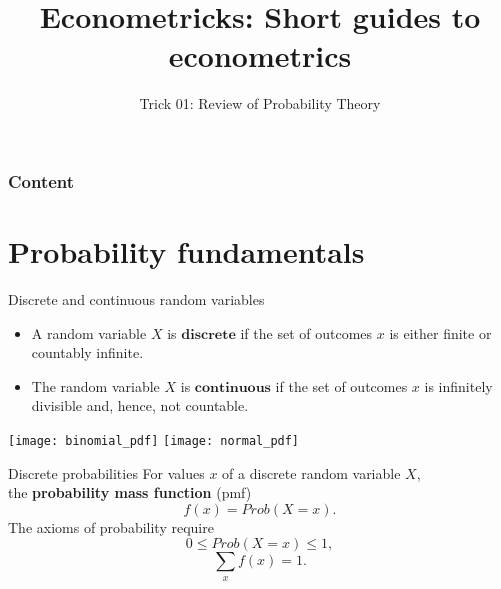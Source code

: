 \documentclass[11pt,table]{beamer}
\title[]{Econome\textcolor{red1}{tricks}: Short guides to econometrics}
\author[D. Rostam-Afschar]{Trick 01: Review of Probability Theory}
\institute[]{\textcolor{gray1}{Davud Rostam-Afschar (Uni Mannheim)}}
\date[]{}
\begin{document}
\begin{frame}[plain]
  \titlepage
\end{frame}

\begin{frame}
	\frametitle{Content}
	\tableofcontents[]
\end{frame}

\section{Probability fundamentals}
\begin{frame}{Discrete and continuous random variables}
\begin{minipage}{0.5\linewidth}
\begin{itemize}
  \item A random variable $X$ is $\textbf{discrete}$ if the set of outcomes $x$ is either finite or countably
infinite.
  \item  The random variable $X$ is $\textbf{continuous}$ if the set of outcomes $x$ is infinitely divisible and, hence,
not countable.
\end{itemize}
\end{minipage}
\hspace{10pt}
\begin{minipage}{0.35\linewidth}\centering
{\texttt{[image: binomial\_pdf]}}
{\texttt{[image: normal\_pdf]}}
\end{minipage}
\end{frame}

\begin{frame}{Discrete probabilities}
For values $x$ of a discrete random variable $X$,\\ the \textbf{probability mass function} (pmf)
$$f(x)=Prob(X=x).$$
The axioms of probability require
$$0\leq Prob(X=x)\leq1,$$
$$\sum_x f(x)=1.$$
\end{frame}
\end{document}
